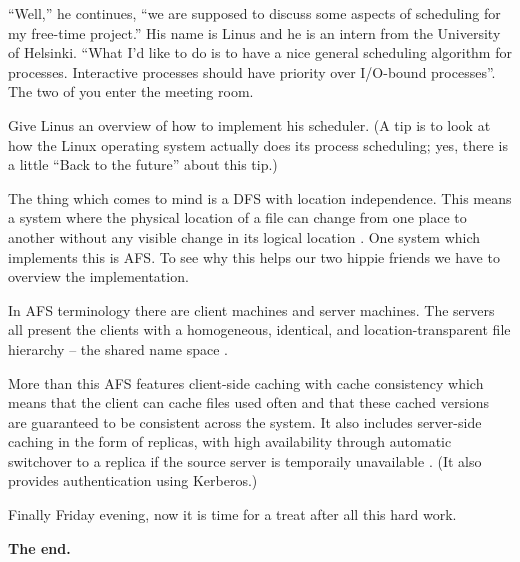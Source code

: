 \documentclass[addpoints]{miunexam}
\begin{document}
\begin{questions}
  ``Well,'' he continues, ``we are supposed to discuss some aspects of 
  scheduling for my free-time project.''
  His name is Linus and he is an intern from the University of Helsinki.
  ``What I'd like to do is to have a nice general scheduling algorithm for 
  processes.
  Interactive processes should have priority over I/O-bound processes''.
  The two of you enter the meeting room.

  Give Linus an overview of how to implement his scheduler.
  (A tip is to look at how the Linux operating system actually does its process 
  scheduling; yes, there is a little ``Back to the future'' about this tip.)
  \begin{solution}
    The thing which comes to mind is a DFS with location independence.
    This means a system where the physical location of a file can change from 
    one place to another without any visible change in its logical location 
    \cite[p. 707]{Silberschatz2009osc}.
    One system which implements this is AFS.
    To see why this helps our two hippie friends we have to overview the 
    implementation.

    In AFS terminology there are client machines and server machines.
    The servers all present the clients with a homogeneous, identical, and 
    location-transparent file hierarchy -- the shared name space \cite[p.  
    719]{Silberschatz2009osc}.

    More than this AFS features client-side caching with cache consistency 
    \cite[p. 718]{Silberschats2009osc} which means that the client can cache 
    files used often and that these cached versions are guaranteed to be 
    consistent across the system.
    It also includes server-side caching in the form of replicas, with high 
    availability through automatic switchover to a replica if the source server 
    is temporaily unavailable \cite[p. 718]{Silberschatz2009osc}.
    (It also provides authentication using Kerberos.)
  \end{solution}
\end{questions}

Finally Friday evening, now it is time for a treat after all this hard work.
\begin{center}
  \textbf{The end.}
\end{center}


\end{document}
